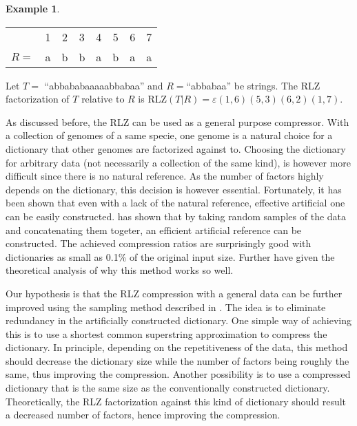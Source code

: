 \documentclass[english,twoside,censored,csm,algorithms-track-2020]{HYthesisML}
\theoremstyle{plain}
\theoremstyle{definition}
\newtheorem{example}[theorem]{Example}
\begin{document}
\begin{example}
  ~\\
  \vspace{-1cm}
  \begin{center}
  \begin{tabular}[H]{r c c c c c c c}
    &1&2&3&4&5&6&7 \\
    $R=$&a&b&b&a&b&a&a \\
  \end{tabular}
  \end{center}
  Let $T=$ ``abbababaaaaabbabaa'' and $R=$``abbabaa'' be strings. The RLZ factorization of $T$
  relative to $R$ is RLZ$(T|R)=\varepsilon(1,6)(5,3)(6,2)(1,7)$.
\end{example}

As discussed before, the RLZ can be used as a general purpose compressor. With a collection of
genomes of a same specie, one genome is a natural choice for a dictionary that other genomes are
factorized against to. Choosing the dictionary for arbitrary data (not necessarily a collection of the
same kind), is however more difficult since there is no natural reference. As the number of factors
highly depends on the dictionary, this decision is however essential. Fortunately, it has been shown
that even with a lack of the natural reference, effective artificial one can be easily constructed.
\citep{Hoobin11} has shown that by taking random samples of the data and concatenating them togeter,
an efficient  artificial reference can be constructed. The achieved compression ratios are surprisingly
good with dictionaries as small as 0.1\% of the original input size. Further \citep{Gagie16} have
given the theoretical analysis of why this method works so well.

Our hypothesis is that the RLZ compression with a general data can be further improved using the
sampling method described in \citep{Hoobin11}. The idea is to eliminate redundancy in the
artificially constructed dictionary. One simple way of achieving this is to use a shortest common
superstring approximation to compress the dictionary. In principle, depending on the repetitiveness
of the data, this method should decrease the dictionary size while the number of factors being
roughly the same, thus improving the compression. Another possibility is to use a compressed
dictionary that is the same size as the conventionally constructed dictionary. Theoretically, the
RLZ factorization against this kind of dictionary should result a decreased number of factors,
hence improving the compression.
\end{document}
